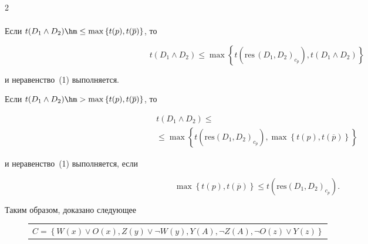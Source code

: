 \begin{multicols}{2}
\begin{multline*}
\end{multline*}


  


  Если $t(D_1\wedge D_2)\hm\leq \max \left\{ t(p), t(\overline{p})\right\}$, то


  $$


  t(D_1\wedge D_2)\leq \max \left\{ t\left( \mathrm{res}\,(D_1, D_2)_{c_p}\right), 


t(D_1\wedge D_2)\right\}


  $$


и неравенство~(1) выполняется.


  


  Если $t(D_1\wedge D_2) \hm> \max \left\{ t(p), t(\overline{p})\right\}$, то


\begin{multline*}


t(D_1\wedge D_2) \leq {}\\


{}\leq


\max\left\{ t\left( \mathrm{res}\left(D_1, D_2\right)_{c_p}\right), \max \left\{ 


t(p), t (\overline{p})\right\}\right\}


\end{multline*}


и неравенство~(1) выполняется, если 


$$


\max \left\{ t(p),t(\overline{p})\right\} 


\leq t\left( \mathrm{res}\left(D_1, D_2\right)_{c_p}\right).


$$


  


  Таким образом, доказано следующее


  


  \begin{figure}[b] %


\begin{center}


{\small


 \begin{tabular}{|p{124mm}|}


\hline


$C=\left\{ W(x)\vee O(x), Z(y)\vee \neg W(y), Y(A), \neg Z(A), \neg O(z)\vee Y(z)\right\}$\newline



\end{tabular}}
\end{center}
\end{figure}
\end{multicols}
